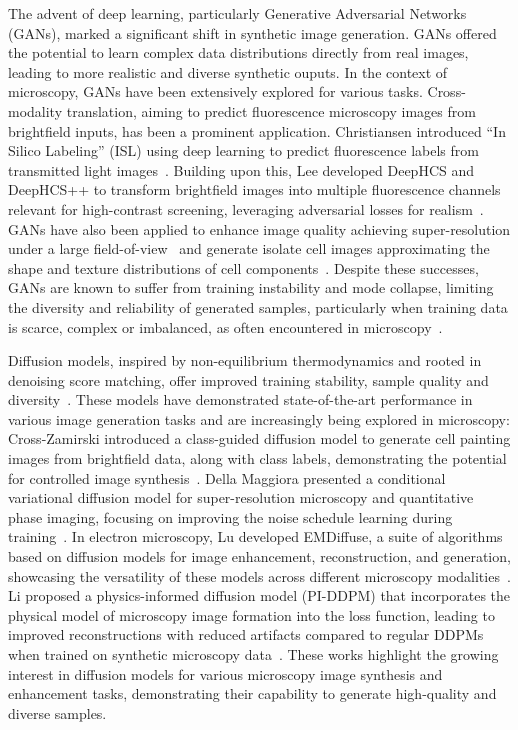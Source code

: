 The advent of deep learning, particularly Generative Adversarial Networks (GANs), marked a significant shift in synthetic image generation.
GANs offered the potential to learn complex data distributions directly from real images, leading to more realistic and diverse synthetic ouputs.
In the context of microscopy, GANs have been extensively explored for various tasks.
Cross-modality translation, aiming to predict fluorescence microscopy images from brightfield inputs, has been a prominent application.
Christiansen \etal introduced ``In Silico Labeling'' (ISL) using deep learning to predict fluorescence labels from transmitted light images~\cite{christiansen_silico_2018}.
Building upon this, Lee \etal developed DeepHCS and DeepHCS++ to transform brightfield images into multiple fluorescence channels relevant for high-contrast screening, leveraging adversarial losses for realism~\cite{gyuhyun_lee_deephcs_2018,gyuhyun_lee_deephcs_2021}.
GANs have also been applied to enhance image quality achieving super-resolution under a large field-of-view~\cite{zhang_high-throughput_2019} and generate isolate cell images approximating the shape and texture distributions of cell components~\cite{marin_scalbert_generic_2019}.
Despite these successes, GANs are known to suffer from training instability and mode collapse, limiting the diversity and reliability of generated samples, particularly when training data is scarce, complex or imbalanced, as often encountered in microscopy~\cite{juan_c_caicedo_evaluation_2019,ricard_durall_combating_2020}.


Diffusion models, inspired by non-equilibrium thermodynamics and rooted in denoising score matching, offer improved training stability, sample quality and diversity~\cite{jascha_sohl-dickstein_deep_2015,ho_denoising_2020,song_denoising_2020}.
These models have demonstrated state-of-the-art performance in various image generation tasks and are increasingly being explored in microscopy:
Cross-Zamirski \etal introduced a class-guided diffusion model to generate cell painting images from brightfield data, along with class labels, demonstrating the potential for controlled image synthesis~\cite{cross-zamirski_class-guided_2023}.
Della Maggiora \etal presented a conditional variational diffusion model for super-resolution microscopy and quantitative phase imaging, focusing on improving the noise schedule learning during training~\cite{gabriel_della_maggiora_conditional_2023}.
In electron microscopy, Lu \etal developed EMDiffuse, a suite of algorithms based on diffusion models for image enhancement, reconstruction, and generation, showcasing the versatility of these models across different microscopy modalities~\cite{lu_diffusion-based_2024}.
Li \etal proposed a physics-informed diffusion model (PI-DDPM) that incorporates the physical model of microscopy image formation into the loss function, leading to improved reconstructions with reduced artifacts compared to regular DDPMs when trained on synthetic microscopy data~\cite{li_microscopy_2023}.
These works highlight the growing interest in diffusion models for various microscopy image synthesis and enhancement tasks, demonstrating their capability to generate high-quality and diverse samples.

